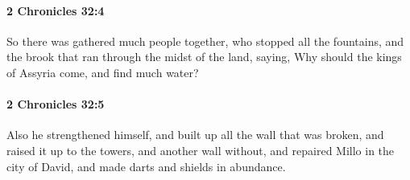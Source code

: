 		\paragraph{2 Chronicles 32:4} %
			\label{2CHRONICLES-32-4}

			So there was gathered much people together, who stopped all the fountains, and the brook that ran through the midst of the land, saying, Why should the kings of Assyria come, and find much water?


		\paragraph{2 Chronicles 32:5} %
			\label{2CHRONICLES-32-5}

			Also he strengthened himself, and built up all the wall that was broken, and raised it up to the towers, and another wall without, and repaired Millo in the city of David, and made darts and shields in abundance.

